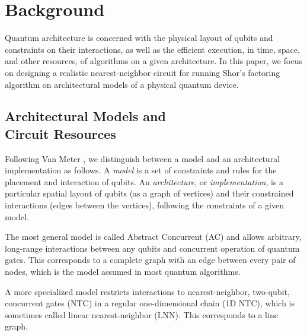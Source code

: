 \section{Background}
\label{sec:bg}

Quantum architecture is concerned with the physical layout of
qubits and constraints on their interactions,
as well as the efficient execution, in time, space, and other resources, of
algorithms on a given architecture.
In this paper, we focus on designing a realistic nearest-neighbor circuit for running
Shor's factoring algorithm on architectural models of a physical quantum device.

\subsection{Architectural Models and\\ Circuit Resources}
\label{subsec:models}

Following Van Meter \cite{VanMeter2005},
we distinguish between a model and an architectural implementation as follows.
A \emph{model} is a set of constraints and rules for the placement and
interaction of qubits.
An \emph{architecture}, or \emph{implementation}, is a particular
spatial layout of qubits (as a graph of vertices) and their
constrained interactions (edges between the vertices),
following the constraints of a given model.

The most general model is called Abstract Concurrent (\textsc{AC})
and allows arbitrary, long-range interactions between any qubits and concurrent
operation of quantum gates.
This corresponds to a complete graph with an edge between every pair of nodes,
which is the model assumed in most quantum algorithms.

A more specialized model restricts interactions to nearest-neighbor, two-qubit,
concurrent gates (\textsc{NTC}) in a regular one-dimensional chain (1D NTC),
which is sometimes called linear nearest-neighbor (\textsc{LNN}).
This corresponds to a line graph.

